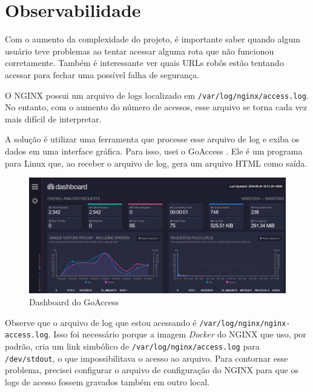 \chapter{Observabilidade}

Com o aumento da complexidade do projeto, é importante saber quando algum usuário 
teve problemas ao tentar acessar alguma rota que não funcionou corretamente.
Também é interessante ver quais URLs robôs estão tentando acessar para fechar uma
possível falha de segurança.

O NGINX possui um arquivo de logs localizado em \verb|/var/log/nginx/access.log|. 
No entanto, com o aumento do número de acessos, esse arquivo se torna cada vez 
mais difícil de interpretar.

A solução é utilizar uma ferramenta que processe esse arquivo de log e exiba os 
dados em uma interface gráfica. Para isso, usei o GoAccess \cite{goaccess}. Ele 
é um programa para Linux que, ao receber o arquivo de log, gera um arquivo HTML 
como saída.




\begin{figure}[ht]
    \begin{center}
    \includegraphics[width=400pt]{img/dashboard.png}
    \caption{Dashboard do GoAccess}
    \label{fig:cloudflare-stat.png}
    \end{center}
\end{figure}

Observe que o arquivo de log que estou acessando é \verb|/var/log/nginx/nginx-access.log|. 
Isso foi necessário porque a imagem \textit{Docker} do NGINX que uso, por padrão, cria um 
link simbólico de \verb|/var/log/nginx/access.log| para \verb|/dev/stdout|, o que 
impossibilitava o acesso ao arquivo. Para contornar esse problema, precisei 
configurar o arquivo de configuração do NGINX para que os logs de acesso fossem 
gravados também em outro local.

